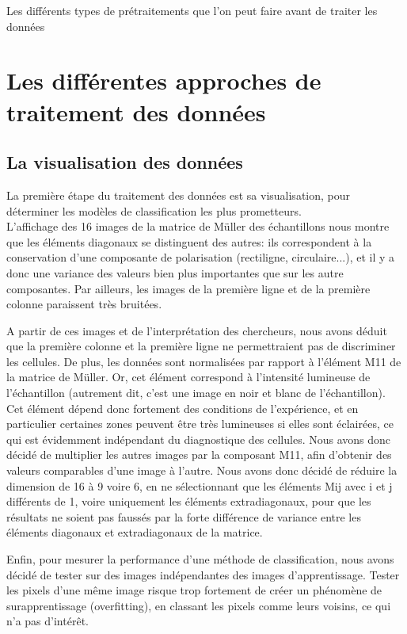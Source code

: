 \documentclass[a4paper,10pt]{report}
\begin{document}
Les différents types de prétraitements que l'on peut faire avant de traiter les données
\section{Les différentes approches de traitement des données}

\subsection{La visualisation des données}

La première étape du traitement des données est sa visualisation, pour déterminer les modèles de classification les plus prometteurs.\\

L'affichage des 16 images de la matrice de Müller des échantillons nous montre que les éléments diagonaux se distinguent des autres: ils correspondent à la conservation d'une composante de polarisation (rectiligne, circulaire...), et il y a donc une variance des valeurs bien plus importantes que sur les autre composantes. Par ailleurs, les images de la première ligne et de la première colonne paraissent très bruitées. 

A partir de ces images et de l'interprétation des chercheurs, nous avons déduit que la première colonne et la première ligne ne permettraient pas de discriminer les cellules. De plus, les données sont normalisées par rapport à l'élément M11 de la matrice de Müller. Or, cet élément correspond à l'intensité lumineuse de l'échantillon (autrement dit, c'est une image en noir et blanc de l'échantillon). Cet élément dépend donc fortement des conditions de l'expérience, et en particulier certaines zones peuvent être très lumineuses si elles sont éclairées, ce qui est évidemment indépendant du diagnostique des cellules. Nous avons donc décidé de multiplier les autres images par la composant M11, afin d'obtenir des valeurs comparables d'une image à l'autre. Nous avons donc décidé de réduire la dimension de 16 à 9 voire 6, en ne sélectionnant que les éléments Mij avec i et j différents de 1, voire uniquement les éléments extradiagonaux, pour que les résultats ne soient pas faussés par la forte différence de variance entre les éléments diagonaux et extradiagonaux de la matrice. 


Enfin, pour mesurer la performance d'une méthode de classification, nous avons décidé de tester sur des images indépendantes des images d'apprentissage. Tester les pixels d'une même image risque trop fortement de créer un phénomène de surapprentissage (overfitting), en classant les pixels comme leurs voisins, ce qui n'a pas d'intérêt.
\end{document}
